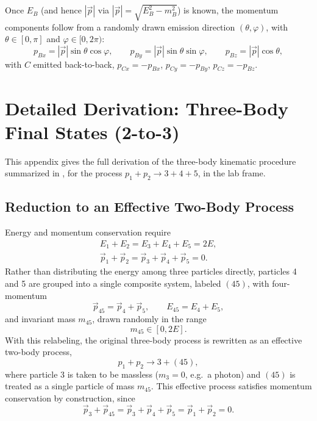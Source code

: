 \documentclass{article}
\begin{document}
Once $E_B$ (and hence $|\vec{p}|$ via $|\vec{p}| = \sqrt{E_B^2 - m_B^2}$) is known, the momentum components follow from a randomly drawn emission direction $(\theta, \varphi)$, with $\theta \in [0,\pi]$ and $\varphi \in [0, 2\pi)$:
\begin{equation}
    p_{Bx} = |\vec{p}|\sin\theta\cos\varphi, \qquad p_{By} = |\vec{p}|\sin\theta\sin\varphi, \qquad p_{Bz} = |\vec{p}|\cos\theta,
\end{equation}
with $C$ emitted back-to-back, $p_{Cx} = -p_{Bx}$, $p_{Cy} = -p_{By}$, $p_{Cz} = -p_{Bz}$.

\section{Detailed Derivation: Three-Body Final States (2-to-3)}
\label{app:2to3}
This appendix gives the full derivation of the three-body kinematic procedure summarized in , for the process $p_1 + p_2 \rightarrow 3 + 4 + 5$, in the lab frame.

\subsection{Reduction to an Effective Two-Body Process}
Energy and momentum conservation require
\begin{equation}
\begin{gathered}
    E_1 + E_2 = E_3 + E_4 + E_5 = 2E, \\
    \vec{p}_1 + \vec{p}_2 = \vec{p}_3 + \vec{p}_4 + \vec{p}_5 = 0.
\end{gathered}
\end{equation}
Rather than distributing the energy among three particles directly, particles 4 and 5 are grouped into a single composite system, labeled $(45)$, with four-momentum
\begin{equation}
    \vec{p}_{45} = \vec{p}_4 + \vec{p}_5, \qquad E_{45} = E_4 + E_5,
\end{equation}
and invariant mass $m_{45}$, drawn randomly in the range
\begin{equation}
    m_{45} \in [0, 2E].
\end{equation}
With this relabeling, the original three-body process is rewritten as an effective two-body process,
\begin{equation}
    p_1 + p_2 \rightarrow 3 + (45),
\end{equation}
where particle 3 is taken to be massless ($m_3 = 0$, e.g.\ a photon) and $(45)$ is treated as a single particle of mass $m_{45}$. This effective process satisfies momentum conservation by construction, since
\begin{equation}
    \vec{p}_3 + \vec{p}_{45} = \vec{p}_3 + \vec{p}_4 + \vec{p}_5 = \vec{p}_1 + \vec{p}_2 = 0.
\end{equation}
\end{document}
